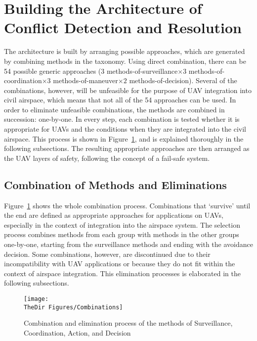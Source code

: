 \section{Building the Architecture of Conflict Detection and Resolution}
The architecture is built by arranging possible approaches, which are generated by combining methods in the taxonomy. Using direct combination, there can be 54 possible generic approaches ($3$ methods-of-surveillance$\times 3$ methods-of-coordination$\times 3$ methods-of-maneuver$\times 2$ methods-of-decision).  Several of the combinations, however, will be unfeasible for the purpose of UAV integration into civil airspace, which means that not all of the 54 approaches can be used. In order to eliminate unfeasible combinations, the methods are combined in succession: one-by-one. In every step, each combination is tested whether it is appropriate for UAVs and the conditions when they are integrated into the civil airspace. This process is shown in Figure~\ref{f:Combination}, and is explained thoroughly in the following subsections. The resulting appropriate approaches are then arranged as the UAV layers of safety, following the concept of a fail-safe system. 

\subsection{Combination of Methods and Eliminations}

Figure~\ref{f:Combination} shows the whole combination process. Combinations that `survive' until the end are defined as appropriate approaches for applications on UAVs, especially in the context of integration into the airspace system. The selection process combines methods from each group with methods in the other groups one-by-one, starting from the surveillance methods and ending with the avoidance decision. Some combinations, however, are discontinued due to their incompatibility with UAV applications or because they do not fit within the context of airspace integration. This elimination processes is elaborated in the following subsections.

\begin{figure}[t!]
 \centering
  \texttt{[image: \\TheDir Figures/Combinations]}
  \caption{Combination and elimination process of the methods of Surveillance, Coordination, Action, and Decision}
  \label{f:Combination}
\end{figure}
 
